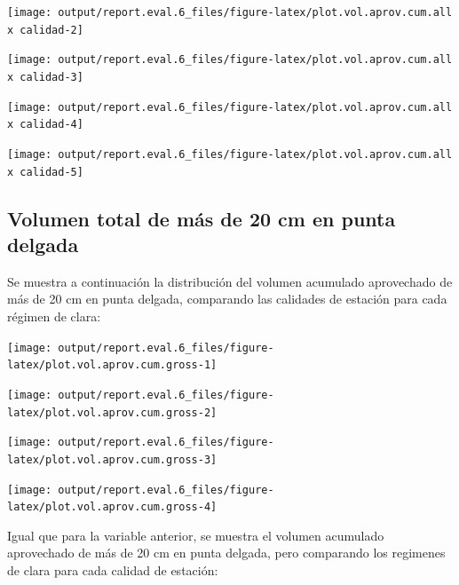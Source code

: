 \documentclass[]{article}
\begin{document}
\begin{center}\texttt{[image: output/report.eval.6\_files/figure-latex/plot.vol.aprov.cum.all x calidad-2]} \end{center}

\begin{center}\texttt{[image: output/report.eval.6\_files/figure-latex/plot.vol.aprov.cum.all x calidad-3]} \end{center}

\begin{center}\texttt{[image: output/report.eval.6\_files/figure-latex/plot.vol.aprov.cum.all x calidad-4]} \end{center}

\begin{center}\texttt{[image: output/report.eval.6\_files/figure-latex/plot.vol.aprov.cum.all x calidad-5]} \end{center}

\subsection{Volumen total de más de 20 cm en punta
delgada}\label{volumen-total-de-muxe1s-de-20-cm-en-punta-delgada}

Se muestra a continuación la distribución del volumen acumulado
aprovechado de más de 20 cm en punta delgada, comparando las calidades
de estación para cada régimen de clara:

\begin{center}\texttt{[image: output/report.eval.6\_files/figure-latex/plot.vol.aprov.cum.gross-1]} \end{center}

\begin{center}\texttt{[image: output/report.eval.6\_files/figure-latex/plot.vol.aprov.cum.gross-2]} \end{center}

\begin{center}\texttt{[image: output/report.eval.6\_files/figure-latex/plot.vol.aprov.cum.gross-3]} \end{center}

\begin{center}\texttt{[image: output/report.eval.6\_files/figure-latex/plot.vol.aprov.cum.gross-4]} \end{center}

Igual que para la variable anterior, se muestra el volumen acumulado
aprovechado de más de 20 cm en punta delgada, pero comparando los
regimenes de clara para cada calidad de estación:
\end{document}

